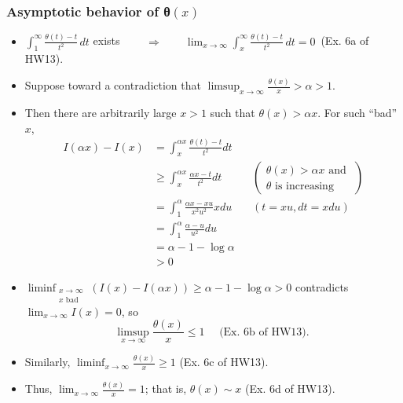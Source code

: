 \documentclass[12pt]{article}
\begin{document}
\subsubsection{Asymptotic behavior of θ$(x)$}
\begin{itemize}
    \item
      \(\int_{1}^{\infty}\frac{\theta(t)-t}{t^{2}}\,dt\) exists
      \(\qquad\Longrightarrow\qquad\lim_{x\to\infty}\int_{x}^{\infty}\frac{\theta(t)-t}{t^{2}}\,dt=0\,\)
      (Ex. 6a of HW13).
    \item
      Suppose toward a contradiction that
      \(\limsup_{x\to\infty}\frac{\theta(x)}{x}>\alpha>1\).
    \item
      Then there are arbitrarily large \(x>1\) such that
      \(\theta(x)>\alpha x\). For such ``bad'' \(x\), \[
  \begin{aligned}
  I(\alpha x)-I(x) & =\int_x^{\alpha x} \frac{\theta(t)-t}{t^2} d t \\
  & \geq \int_x^{\alpha x} \frac{\alpha x-t}{t^2} d t && \left(\begin{array}{c}
    \theta(x)>\alpha x \text { and } \\
    \theta \text { is increasing }
    \end{array}\right) \\
  & =\int_1^\alpha \frac{\alpha x-x u}{x^2 u^2} x d u && (t=x u, d t=x d u)\\
  & =\int_1^\alpha \frac{\alpha-u}{u^2} d u \\
  & =\alpha-1-\log \alpha \\
  & >0
  \end{aligned}
  \]
\item
  \(\liminf _{\substack{x \rightarrow \infty \\ x \text { bad }}}(I( x)-I(\alpha x)) \geq \alpha-1-\log \alpha>0\)
  contradicts \(\lim _{x \rightarrow \infty} I(x)=0\), so \[
  \limsup _{x \rightarrow \infty} \frac{\theta(x)}{x} \leq 1 \quad \text { (Ex. 6b of HW13). }
  \]
\item
  Similarly,
  \(\liminf _{x \rightarrow \infty} \frac{\theta(x)}{x} \geq 1\) (Ex. 6c
  of HW13).
\item
  Thus, \(\lim _{x \rightarrow \infty} \frac{\theta(x)}{x}=1\); that is,
  \(\theta(x) \sim x\) (Ex. 6d of HW13).
    \end{itemize}
\end{document}
